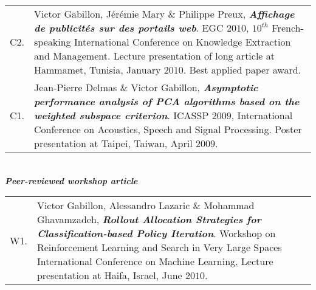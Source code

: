 \begin{tabularx}{\columnwidth}{@{} l X @{}}
C2. & Victor Gabillon, Jérémie Mary $\&$ Philippe Preux, \textbf{ \emph{Affichage de publicités sur des portails web}}. EGC $2010$, $10^{th}$ French-speaking International Conference on Knowledge Extraction and Management. Lecture presentation of long article at Hammamet, Tunisia, January $2010$. Best applied paper award.\\

 
C1. & Jean-Pierre Delmas $\&$ Victor Gabillon,\textbf{ \emph{Asymptotic performance analysis of PCA algorithms based on the weighted subspace criterion}}.  ICASSP $2009$, International Conference on Acoustics, Speech and Signal Processing. Poster presentation at Taipei, Taiwan, April $2009$. 
   \end{tabularx}\\

\noindent\textit{\textbf{Peer-reviewed workshop article}}\\
\noindent\begin{tabularx}{\columnwidth}{@{} l X @{}}
 W1. & Victor Gabillon,  Alessandro Lazaric $\&$ Mohammad Ghavamzadeh, \textbf{ \emph{Rollout Allocation Strategies for Classification-based Policy Iteration}}. Workshop on Reinforcement Learning and Search in Very Large Spaces International Conference on Machine Learning,  Lecture presentation at Haifa, Israel, June $2010$.
  \end{tabularx}\\
  
  

